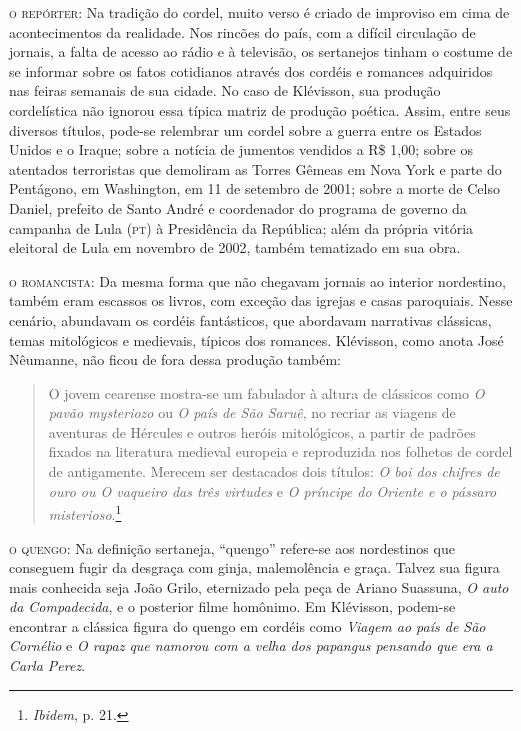 \documentclass[11pt]{extarticle}
\begin{document}
\noindent\textsc{o repórter}: Na tradição do cordel, muito verso é criado de improviso em cima de acontecimentos da realidade. Nos rincões do país, com a difícil circulação de jornais, a falta de acesso ao rádio e à televisão, os sertanejos tinham o costume de se informar sobre os fatos cotidianos através dos cordéis e romances adquiridos nas feiras semanais de sua cidade.
No caso de Klévisson, sua produção cordelística não ignorou essa típica matriz de produção poética. Assim, entre seus diversos títulos, pode-se relembrar um cordel sobre a guerra entre os Estados Unidos e o Iraque; sobre a notícia de jumentos vendidos a R\$ 1,00; sobre 
os atentados terroristas que demoliram as Torres Gêmeas em Nova York e parte do Pentágono, em Washington, em 11 de setembro de 2001; sobre a morte de Celso Daniel, prefeito de Santo André e coordenador do programa de governo da campanha de Lula (\textsc{pt}) à Presidência da República; além da própria vitória eleitoral de Lula em novembro de 2002, também tematizado em sua obra.

\noindent\textsc{o romancista}: Da mesma forma que não chegavam jornais ao interior nordestino, também eram escassos os livros, com exceção das igrejas e casas paroquiais.
Nesse cenário, abundavam os cordéis fantásticos, que abordavam narrativas clássicas, temas mitológicos e medievais, típicos dos romances. 
Klévisson, como anota José Nêumanne, não ficou de fora dessa produção também:

\begin{quote}
O jovem cearense mostra-se um fabulador à altura de clássicos como \textit{O pavão mysteriozo} ou \textit{O país de São Saruê}, no recriar as viagens de aventuras de Hércules e outros heróis mitológicos, a partir de padrões fixados na literatura medieval europeia e reproduzida nos folhetos de cordel de antigamente. Merecem ser destacados dois títulos: \textit{O boi dos chifres de ouro ou O vaqueiro das três virtudes} e \textit{O príncipe do Oriente e o pássaro misterioso}.\footnote{\textit{Ibidem}, p. 21.}
\end{quote}

\noindent\textsc{o quengo}: Na definição sertaneja, ``quengo'' refere-se aos nordestinos que conseguem fugir da desgraça com ginja, malemolência e graça. Talvez sua figura mais conhecida seja João Grilo, eternizado pela peça de Ariano Suassuna, \textit{O auto da Compadecida}, e o posterior filme homônimo. Em Klévisson, podem-se encontrar a clássica figura do quengo em cordéis como \textit{Viagem ao país de São Cornélio} e \textit{O rapaz que namorou com a velha dos papangus pensando que era a Carla Perez}. 
\end{document}
